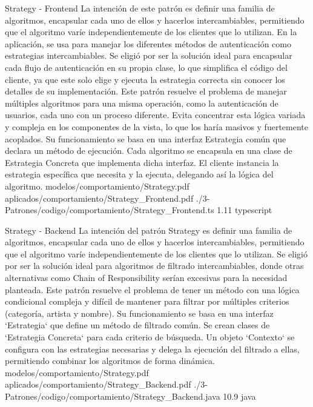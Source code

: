 \Patron
    {Strategy - Frontend}
    {La intención de este patrón es definir una familia de algoritmos, encapsular cada uno de ellos y hacerlos intercambiables, permitiendo que el algoritmo varíe independientemente de los clientes que lo utilizan. En la aplicación, se usa para manejar los diferentes métodos de autenticación como estrategias intercambiables. Se eligió por ser la solución ideal para encapsular cada flujo de autenticación en su propia clase, lo que simplifica el código del cliente, ya que este solo elige y ejecuta la estrategia correcta sin conocer los detalles de su implementación.}
    {Este patrón resuelve el problema de manejar múltiples algoritmos para una misma operación, como la autenticación de usuarios, cada uno con un proceso diferente. Evita concentrar esta lógica variada y compleja en los componentes de la vista, lo que los haría masivos y fuertemente acoplados. Su funcionamiento se basa en una interfaz Estrategia común que declara un método de ejecución. Cada algoritmo se encapsula en una clase de Estrategia Concreta que implementa dicha interfaz. El cliente instancia la estrategia específica que necesita y la ejecuta, delegando así la lógica del algoritmo.}
    {modelos/comportamiento/Strategy.pdf}
    {aplicados/comportamiento/Strategy_Frontend.pdf}
    {./3-Patrones/codigo/comportamiento/Strategy_Frontend.ts}
    {1.1}{1}
    {typescript}
\newpage

\Patron
    {Strategy - Backend}
    {La intención del patrón Strategy es definir una familia de algoritmos, encapsular cada uno de ellos y hacerlos intercambiables, permitiendo que el algoritmo varíe independientemente de los clientes que lo utilizan. Se eligió por ser la solución ideal para algoritmos de filtrado intercambiables, donde otras alternativas como Chain of Responsibility serían excesivas para la necesidad planteada.}
    {Este patrón resuelve el problema de tener un método con una lógica condicional compleja y difícil de mantener para filtrar por múltiples criterios (categoría, artista y nombre). Su funcionamiento se basa en una interfaz `Estrategia` que define un método de filtrado común. Se crean clases de `Estrategia Concreta` para cada criterio de búsqueda. Un objeto `Contexto` se configura con las estrategias necesarias y delega la ejecución del filtrado a ellas, permitiendo combinar los algoritmos de forma dinámica.}
    {modelos/comportamiento/Strategy.pdf}
    {aplicados/comportamiento/Strategy_Backend.pdf}
    {./3-Patrones/codigo/comportamiento/Strategy_Backend.java}
    {1}{0.9}
    {java}
\newpage

